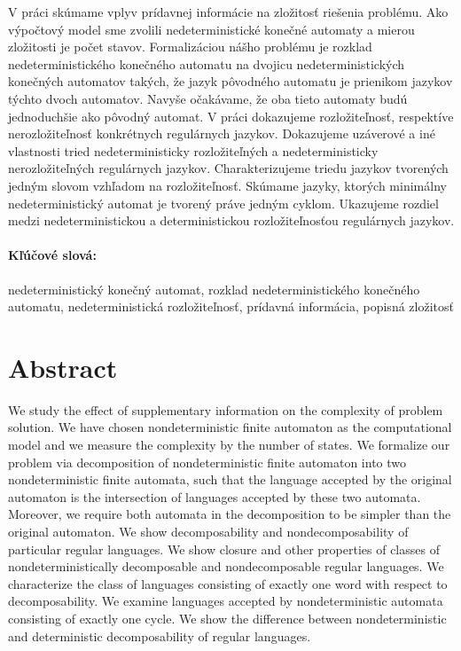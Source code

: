 \documentclass[12pt, oneside]{book}
\begin{document}
V práci skúmame vplyv prídavnej informácie na zložitosť riešenia problému. Ako výpočtový model sme zvolili nedeterministické konečné automaty a mierou zložitosti je počet stavov. Formalizáciou nášho problému je rozklad nedeterministického konečného automatu na dvojicu nedeterministických konečných automatov takých, že jazyk pôvodného automatu je prienikom jazykov týchto dvoch automatov. Navyše očakávame, že oba tieto automaty budú jednoduchšie ako pôvodný automat. V práci dokazujeme rozložiteľnosť, respektíve nerozložiteľnosť konkrétnych regulárnych jazykov. Dokazujeme uzáverové a iné vlastnosti tried nedeterministicky rozložiteľných a nedeterministicky nerozložiteľných regulárnych jazykov. Charakterizujeme triedu jazykov tvorených jedným slovom vzhľadom na rozložiteľnosť. Skúmame jazyky, ktorých minimálny nedeterministický automat je tvorený práve jedným cyklom. Ukazujeme rozdiel medzi nedeterministickou a deterministickou rozložiteľnosťou regulárnych jazykov.

\paragraph*{Kľúčové slová:} nedeterministický konečný automat, rozklad nedeterministického konečného automatu, nedeterministická rozložiteľnosť, prídavná informácia, popisná zložitosť


\newpage 
\section*{Abstract}

We study the effect of supplementary information on the complexity of problem solution. We have chosen nondeterministic finite automaton as the computational model and we measure the complexity by the number of states. We formalize our problem via decomposition of nondeterministic finite automaton into two nondeterministic finite automata, such that the language accepted by the original automaton is the intersection of languages accepted by these two automata. Moreover, we require both automata in the decomposition to be simpler than the original automaton. We show decomposability and nondecomposability of particular regular languages. We show closure and other properties of classes of nondeterministically decomposable and nondecomposable regular languages. We characterize the class of languages consisting of exactly one word with respect to decomposability. We examine languages accepted by nondeterministic automata consisting of exactly one cycle. We show the difference between nondeterministic and deterministic decomposability of regular languages.
\end{document}
